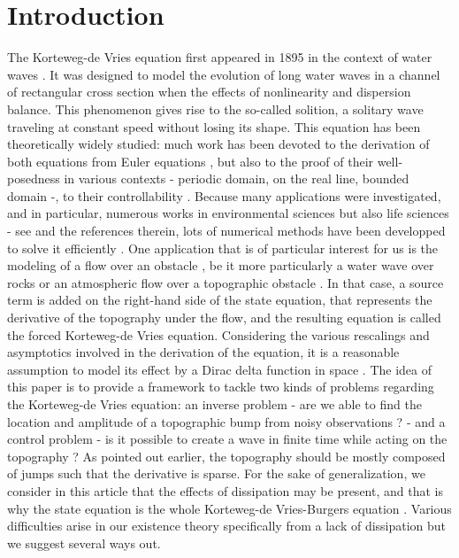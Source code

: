
\section{Introduction}

The Korteweg-de Vries equation first appeared in 1895 in the context of water waves \cite{korteweg1895xli}. It was designed to model the evolution of long water waves in a channel of rectangular cross section when the effects of nonlinearity and dispersion balance. This phenomenon gives rise to the so-called solition, a solitary wave traveling at constant speed without losing its shape. This equation has been theoretically widely studied: much work has been devoted to the derivation of both equations from Euler equations \cite{shen1992forced,constantin2008,su2003korteweg}, but also to the proof of their well-posedness in various contexts \cite{miura1976korteweg,kenig1993,bourgain1997periodic} - periodic domain, on the real line, bounded domain -, to their controllability \cite{rosier1997exact,glass2008some,coron2003exact,chapouly2009global}. 
Because many applications were investigated, and in particular, numerous works in environmental sciences but also life sciences - see \cite{dauxois2006physics,whitham2011linear,Crepeau2007594,yomosa1987} and the references therein, lots of numerical methods have been developped to solve it efficiently \cite{trefethen2000spectral,shen2003new,ma2000legendre}. One application that is of particular interest for us is the modeling of a flow over an obstacle \cite{milewski2004forced,shen1992forced,shen1996accuracy}, be it more particularly a water wave over rocks or an atmospheric flow over a topographic obstacle \cite{baines1997topographic}. In that case, a source term is added on the right-hand side of the state equation, that represents the derivative of the topography under the flow, and the resulting equation is called the forced Korteweg-de Vries equation. Considering the various rescalings and asymptotics involved in the derivation of the \KdV equation, it is a reasonable assumption to model its effect by a Dirac delta function in space \cite{shen1996accuracy, shen2000bumpdirac}. The idea of this paper is to provide a framework to tackle two kinds of problems regarding the Korteweg-de Vries equation: an inverse problem - are we able to find the location and amplitude of a topographic bump from noisy observations ? -  and a control problem - is it possible to create a wave in finite time while acting on the topography ? As pointed out earlier, the topography should be mostly composed of jumps such that the derivative is sparse. For the sake of generalization, we consider in this article that the effects of dissipation may be present, and that is why the state equation is the whole Korteweg-de Vries-Burgers equation \cite{su2003korteweg}. Various difficulties arise in our existence theory specifically from a lack of dissipation but we suggest several ways out.

